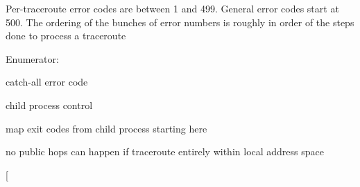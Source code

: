 Per-traceroute error codes are between 1 and 499. General error codes start at 500. The ordering of the bunches of error numbers is roughly in order of the steps done to process a traceroute \begin{Desc}
\item[Enumerator: ]\par
\begin{description}
\item[{\em 
\hypertarget{classTrStatus_366057e7e0cc467a592518e5f0da5302c3415fb00f1515e6cfcc42d0774f5eb1}{
ERR\_\-UNDEFINED}
\label{classTrStatus_366057e7e0cc467a592518e5f0da5302c3415fb00f1515e6cfcc42d0774f5eb1}
}]catch-all error code \item[{\em 
\hypertarget{classTrStatus_366057e7e0cc467a592518e5f0da5302791e538219fe70804d43a86e51cf73c0}{
ERR\_\-PROCESS\_\-START\_\-FAIL}
\label{classTrStatus_366057e7e0cc467a592518e5f0da5302791e538219fe70804d43a86e51cf73c0}
}]child process control \item[{\em 
\hypertarget{classTrStatus_366057e7e0cc467a592518e5f0da5302942bd0dd29fcfa7e4566a28bbf969393}{
ERR\_\-PROCESS\_\-RC\_\-BASE}
\label{classTrStatus_366057e7e0cc467a592518e5f0da5302942bd0dd29fcfa7e4566a28bbf969393}
}]map exit codes from child process starting here \item[{\em 
\hypertarget{classTrStatus_366057e7e0cc467a592518e5f0da5302257b1efa4186c926bd152bbee68c2c4f}{
ERR\_\-NO\_\-PUBLIC\_\-HOPS}
\label{classTrStatus_366057e7e0cc467a592518e5f0da5302257b1efa4186c926bd152bbee68c2c4f}
}]no public hops can happen if traceroute entirely within local address space \item[{\em 
\hypertarget{classTrStatus_366057e7e0cc467a592518e5f0da53028c1c3321a69ca2c1b6dcf5be3b0e1a79}{
}}
\end{description}
\end{Desc}
